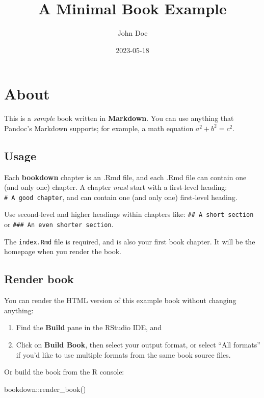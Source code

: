 \documentclass[
]{book}
\title{A Minimal Book Example}
\author{John Doe}
\date{2023-05-18}
\newenvironment{Shaded}{\begin{snugshade}}{\end{snugshade}}
\newcommand{\FunctionTok}[1]{\textcolor[rgb]{0.00,0.00,0.00}{#1}}
\newcommand{\NormalTok}[1]{#1}
\newcommand{\SpecialCharTok}[1]{\textcolor[rgb]{0.00,0.00,0.00}{#1}}
\theoremstyle{definition}
\theoremstyle{definition}
\theoremstyle{definition}
\theoremstyle{definition}
\theoremstyle{remark}
\begin{document}
\maketitle

{
\setcounter{tocdepth}{1}
\tableofcontents
}
\hypertarget{about}{%
\chapter{About}\label{about}}

This is a \emph{sample} book written in \textbf{Markdown}. You can use anything that Pandoc's Markdown supports; for example, a math equation \(a^2 + b^2 = c^2\).

\hypertarget{usage}{%
\section{Usage}\label{usage}}

Each \textbf{bookdown} chapter is an .Rmd file, and each .Rmd file can contain one (and only one) chapter. A chapter \emph{must} start with a first-level heading: \texttt{\#\ A\ good\ chapter}, and can contain one (and only one) first-level heading.

Use second-level and higher headings within chapters like: \texttt{\#\#\ A\ short\ section} or \texttt{\#\#\#\ An\ even\ shorter\ section}.

The \texttt{index.Rmd} file is required, and is also your first book chapter. It will be the homepage when you render the book.

\hypertarget{render-book}{%
\section{Render book}\label{render-book}}

You can render the HTML version of this example book without changing anything:

\begin{enumerate}
\def\labelenumi{\arabic{enumi}.}
\item
  Find the \textbf{Build} pane in the RStudio IDE, and
\item
  Click on \textbf{Build Book}, then select your output format, or select ``All formats'' if you'd like to use multiple formats from the same book source files.
\end{enumerate}

Or build the book from the R console:

\begin{Shaded}
\begin{Highlighting}[]
\NormalTok{bookdown}\SpecialCharTok{::}\FunctionTok{render\_book}\NormalTok{()}
\end{Highlighting}
\end{Shaded}
\end{document}
